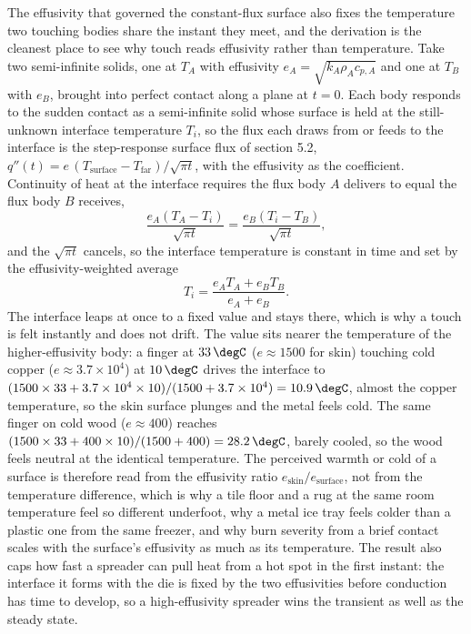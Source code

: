 

\begin{mastery}
The effusivity that governed the constant-flux surface also fixes the
temperature two touching bodies share the instant they meet, and the
derivation is the cleanest place to see why touch reads effusivity rather
than temperature. Take two semi-infinite solids, one at $T_A$ with effusivity
$e_A = \sqrt{k_A\rho_A c_{p,A}}$ and one at $T_B$ with $e_B$, brought into
perfect contact along a plane at $t = 0$. Each body responds to the sudden
contact as a semi-infinite solid whose surface is held at the still-unknown
interface temperature $T_i$, so the flux each draws from or feeds to the
interface is the step-response surface flux of section 5.2,
$q''(t) = e\,(T_{\text{surface}} - T_{\text{far}})/\sqrt{\pi t}$, with the
effusivity as the coefficient. Continuity of heat at the interface requires
the flux body $A$ delivers to equal the flux body $B$ receives,
\[
\frac{e_A (T_A - T_i)}{\sqrt{\pi t}} = \frac{e_B (T_i - T_B)}{\sqrt{\pi t}},
\]
and the $\sqrt{\pi t}$ cancels, so the interface temperature is constant in
time and set by the effusivity-weighted average
\[
T_i = \frac{e_A T_A + e_B T_B}{e_A + e_B}.
\]
The interface leaps at once to a fixed value and stays there, which is why a
touch is felt instantly and does not drift. The value sits nearer the
temperature of the higher-effusivity body: a finger at $33\,\degC$
($e \approx 1500$ for skin) touching cold copper ($e \approx 3.7\times10^4$)
at $10\,\degC$ drives the interface to $(1500\times33 + 3.7\times10^4\times10)
/(1500 + 3.7\times10^4) = 10.9\,\degC$, almost the copper temperature, so the
skin surface plunges and the metal feels cold. The same finger on cold wood
($e \approx 400$) reaches $(1500\times33 + 400\times10)/(1500 + 400) =
28.2\,\degC$, barely cooled, so the wood feels neutral at the identical
temperature. The perceived warmth or cold of a surface is therefore read from
the effusivity ratio $e_{\text{skin}}/e_{\text{surface}}$, not from the
temperature difference, which is why a tile floor and a rug at the same room
temperature feel so different underfoot, why a metal ice tray feels colder
than a plastic one from the same freezer, and why burn severity from a brief
contact scales with the surface's effusivity as much as its temperature. The
result also caps how fast a spreader can pull heat from a hot spot in the
first instant: the interface it forms with the die is fixed by the two
effusivities before conduction has time to develop, so a high-effusivity
spreader wins the transient as well as the steady state.
\end{mastery}


